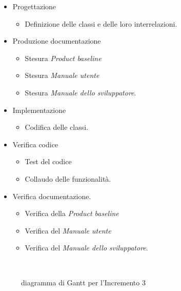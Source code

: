 \documentclass[../piano-di-progetto.tex]{subfiles}
\begin{document}
\begin{itemize}
  \item Progettazione
  \begin{itemize}
    \item Definizione delle classi e delle loro interrelazioni.
  \end{itemize}
  \item Produzione documentazione
  \begin{itemize}
    \item Stesura \textit{Product baseline}
    \item Stesura \textit{Manuale utente}
    \item Stesura \textit{Manuale dello sviluppatore}.
  \end{itemize}
  \item Implementazione
  \begin{itemize}
    \item Codifica delle classi.
  \end{itemize}
  \item Verifica codice
  \begin{itemize}
    \item Test del codice
    \item Collaudo delle funzionalità.
  \end{itemize}
  \item Verifica documentazione.
  \begin{itemize}
    \item Verifica della \textit{Product baseline}
    \item Verifica del \textit{Manuale utente}
    \item Verifica del \textit{Manuale dello sviluppatore}.
  \end{itemize}
\end{itemize}
\begin{figure}[H]
  \centering
  
  \caption{diagramma di Gantt per l'Incremento 3}%
~~\label{fig:gantt_incremento_3}
\end{figure}
\end{document}
